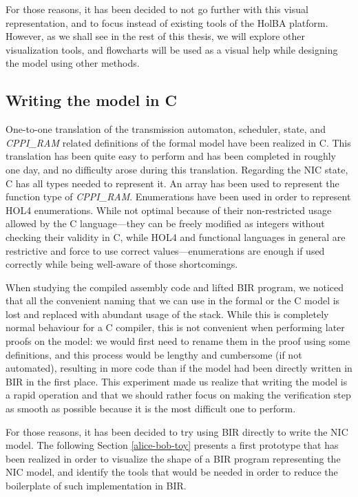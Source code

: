 \documentclass{kththesis}
\begin{document}
{For those reasons, it has been decided to not go further with this visual representation, and to focus instead of existing tools of the HolBA platform. However, as we shall see in the rest of this thesis, we will explore other visualization tools, and flowcharts will be used as a visual help while designing the model using other methods.

\subsection{Writing the model in C} \label{c-model}

One-to-one translation of the transmission automaton, scheduler, state, and \textit{CPPI\_RAM} related definitions of the formal model have been realized in C. This translation has been quite easy to perform and has been completed in roughly one day, and no difficulty arose during this translation. Regarding the NIC state, C has all types needed to represent it. An array has been used to represent the function type of \textit{CPPI\_RAM}. Enumerations have been used in order to represent HOL4 enumerations. While not optimal because of their non-restricted usage allowed by the C language---they can be freely modified as integers without checking their validity in C, while HOL4 and functional languages in general are restrictive and force to use correct values---enumerations are enough if used correctly while being well-aware of those shortcomings.

When studying the compiled assembly code and lifted BIR program, we noticed that all the convenient naming that we can use in the formal or the C model is lost and replaced with abundant usage of the stack. While this is completely normal behaviour for a C compiler, this is not convenient when performing later proofs on the model: we would first need to rename them in the proof using some definitions, and this process would be lengthy and cumbersome (if not automated), resulting in more code than if the model had been directly written in BIR in the first place. This experiment made us realize that writing the model is a rapid operation and that we should rather focus on making the verification step as smooth as possible because it is the most difficult one to perform.

For those reasons, it has been decided to try using BIR directly to write the NIC model. The following Section \ref{alice-bob-toy} presents a first prototype that has been realized in order to visualize the shape of a BIR program representing the NIC model, and identify the tools that would be needed in order to reduce the boilerplate of such implementation in BIR.

}
\end{document}
